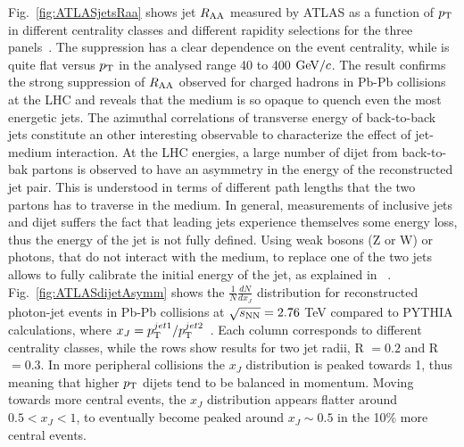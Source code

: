 Fig.~\ref{fig:ATLASjetsRaa} shows jet $R_{\rm AA}$ measured by ATLAS as a function of $p_{\rm T}$ in different centrality classes and different rapidity selections for the three panels~\cite{Aad:2014bxa}. The suppression has a clear dependence on the event centrality, while is quite flat versus $p_{\rm T}$ in the analysed range 40 to 400 $\mathrm{GeV}/c$. The result confirms the strong suppression of $R_{\rm AA}$ observed for charged hadrons in Pb-Pb collisions at the LHC and reveals that the medium is so opaque to quench even the most energetic jets. The azimuthal correlations of transverse energy of back-to-back jets constitute an other interesting observable to characterize the effect of jet-medium interaction. At the LHC energies, a large number of dijet from back-to-bak partons is observed to have an asymmetry in the energy of the reconstructed jet pair. This is understood in terms of different path lengths that the two partons has to traverse in the medium. In general, measurements of inclusive jets and dijet suffers the fact that leading jets experience themselves some energy loss, thus the energy of the jet is not fully defined. Using weak bosons (Z or W) or photons, that do not interact with the medium, to replace one of the two jets allows to fully calibrate the initial energy of the jet, as explained in ~\cite{Wang:1996yh}. Fig.~\ref{fig:ATLASdijetAsymm} shows the $\frac{1}{N}\frac{dN}{dx_J}$ distribution for reconstructed photon-jet events in Pb-Pb collisions at $\sqrt{s_{\rm NN}} = 2.76$ TeV compared to PYTHIA calculations, where $x_J = p_{\rm T}^{jet1}/p_{\rm T}^{jet2}$~\cite{ATLAS-CONF-2012-121}. Each column corresponds to different centrality classes, while the rows show results for two jet radii, R $= 0.2$ and R $=0.3$. In more peripheral collisions the $x_J$ distribution is peaked towards 1, thus meaning that higher $p_{\rm T}$ dijets tend to be balanced in momentum. Moving towards more central events, the $x_J$ distribution appears flatter around $0.5 < x_J<1$, to eventually become peaked around $x_J \sim 0.5$ in the 10\% more central events.


